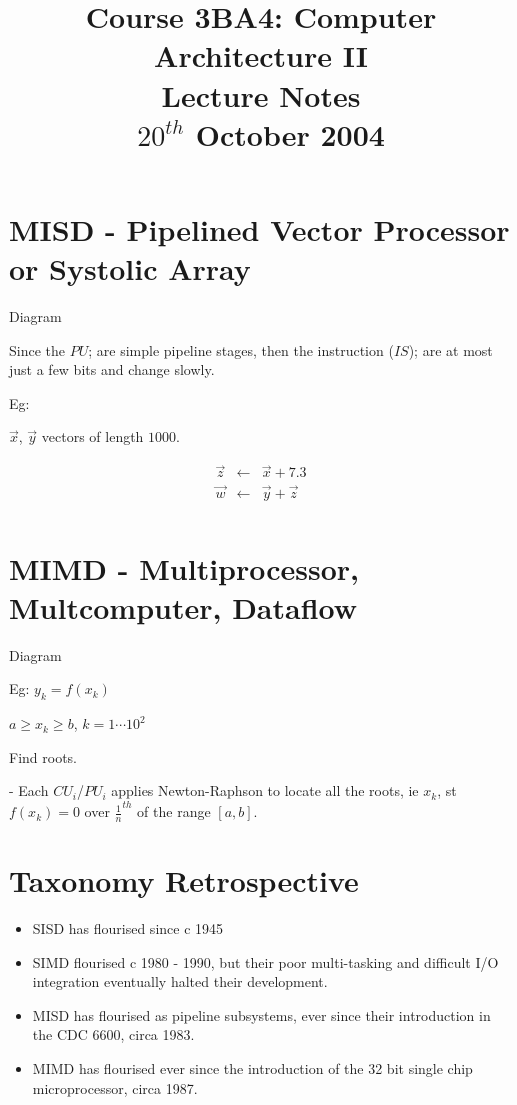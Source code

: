 \documentclass[a4paper,12pt]{article}
\begin{document}
\title{Course 3BA4: Computer Architecture II \\ Lecture Notes \\ $20^{th}$ October 2004}

\maketitle

\section*{MISD - Pipelined Vector Processor or Systolic Array}

Diagram


Since the $PU$; are simple pipeline stages, then the instruction 
($IS$); are at most just a few bits and change slowly.

Eg:

$\vec{x}$, $\vec{y}$ vectors of length $1000$.

\begin{eqnarray*}
\vec{z} & \leftarrow & \vec{x} + 7.3 \\
\vec{w} & \leftarrow & \vec{y} + \vec{z} \\
\end{eqnarray*}

\section*{MIMD - Multiprocessor, Multcomputer, Dataflow}

Diagram


Eg: $y_{k} = f(x_{k})$

$a \geq x_{k} \geq b$, $k = 1 \cdots 10^{2}$


Find roots.


- Each $CU_{i}$/$PU_{i}$ applies Newton-Raphson to locate all the roots,
  ie $x_{k}$, st $f(x_{k}) = 0$ over $\frac{1}{n}^{th}$ of the range
  $[a,b]$.

\section*{Taxonomy Retrospective}

\begin{itemize}

\item SISD has flourised since c 1945

\item SIMD flourised c 1980 - 1990, but their poor multi-tasking and
difficult I/O integration eventually halted their development.

\item MISD has flourised as pipeline subsystems, ever since their
introduction in the CDC 6600, circa 1983.

\item MIMD has flourised ever since the introduction of the 32 bit
single chip microprocessor, circa 1987.
\end{itemize}
\end{document}
